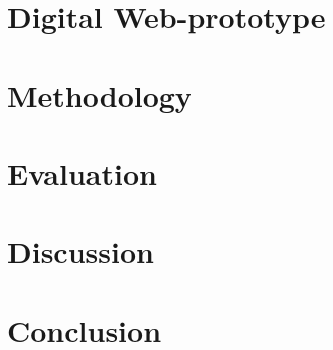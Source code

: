 \documentclass[12pt, twoside]{article}
\begin{document}
\section{Digital Web-prototype}

\section{Methodology}

\section{Evaluation}

\section{Discussion}

\section{Conclusion}



\end{document}
